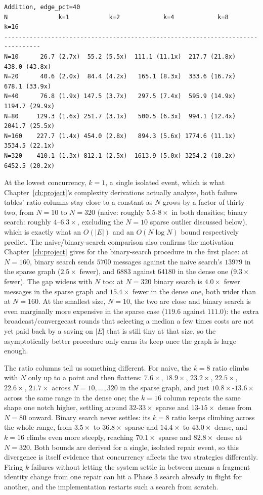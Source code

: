 {\begin{verbatim}
Addition, edge_pct=40
N              k=1           k=2            k=4            k=8            k=16
--------------------------------------------------------------------------------
N=10      26.7 (2.7x)  55.2 (5.5x)  111.1 (11.1x)  217.7 (21.8x)   438.0 (43.8x)
N=20      40.6 (2.0x)  84.4 (4.2x)   165.1 (8.3x)  333.6 (16.7x)   678.1 (33.9x)
N=40      76.8 (1.9x) 147.5 (3.7x)   297.5 (7.4x)  595.9 (14.9x)  1194.7 (29.9x)
N=80     129.3 (1.6x) 251.7 (3.1x)   500.5 (6.3x)  994.1 (12.4x)  2041.7 (25.5x)
N=160    227.7 (1.4x) 454.0 (2.8x)   894.3 (5.6x) 1774.6 (11.1x)  3534.5 (22.1x)
N=320    410.1 (1.3x) 812.1 (2.5x)  1613.9 (5.0x) 3254.2 (10.2x)  6452.5 (20.2x)
\end{verbatim}
}

At the lowest concurrency, $k=1$, a single isolated event, which is what
Chapter~\ref{ch:project}'s complexity derivations actually analyze, both failure tables'
ratio columns stay close to a constant as $N$ grows by a factor of thirty-two, from $N=10$
to $N=320$ (naive: roughly $5.5$-$8\times$ in both densities; binary search: roughly
$4$–$6.3\times$, excluding the $N=10$ sparse outlier discussed below), which is exactly what
an $O(|E|)$ and an $O(N \log N)$ bound respectively predict. The naive/binary-search
comparison also confirms the motivation Chapter~\ref{ch:project} gives for the binary-search
procedure in the first place: at $N=160$, binary search sends $5700$ messages against the
naive search's $13979$ in the sparse graph ($2.5\times$ fewer), and $6883$ against
$64180$ in the dense one ($9.3\times$ fewer). The gap widens
with $N$ too: at $N=320$ binary search is $4.0\times$ fewer messages in the sparse graph and
$15.4\times$ fewer in the dense one, both wider than at $N=160$. At the
smallest size, $N=10$, the two are close and binary search is even marginally more expensive
in the sparse case ($119.6$ against $111.0$): the extra broadcast/convergecast rounds that
selecting a median a few times costs are not yet paid back by a saving on $|E|$ that is
still tiny at that size, so the asymptotically better procedure only earns its keep once the
graph is large enough.

The ratio columns tell us something different. For naive, the $k=8$ ratio climbs with $N$ only up to a point and then flattens:
$7.6\times$, $18.9\times$, $23.2\times$, $22.5\times$, $22.6\times$, $21.7\times$ across
$N=10,\dots,320$ in the sparse graph, and just $10.8\times$-$13.6\times$ across the same
range in the dense one; the $k=16$ column repeats the same shape one notch higher, settling
around $32$-$33\times$ sparse and $13$-$15\times$ dense from $N=80$ onward. Binary search
never settles: its $k=8$ ratio keeps climbing across the whole range, from $3.5\times$ to
$36.8\times$ sparse and $14.4\times$ to $43.0\times$ dense, and $k=16$ climbs even more
steeply, reaching $70.1\times$ sparse and $82.8\times$ dense at $N=320$. Both bounds are derived for a single, isolated repair event, so this divergence is itself
evidence that concurrency affects the two strategies differently. Firing $k$ failures without letting
the system settle in between means a fragment identity change from one repair can hit a
Phase 3 search already in flight for another, and the implementation restarts such a search
from scratch.


